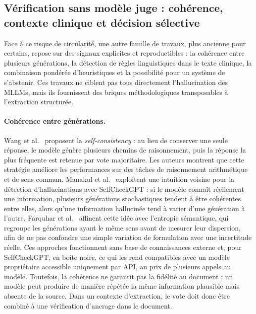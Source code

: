 \subsection{Vérification sans modèle juge : cohérence, contexte clinique et décision sélective}

Face à ce risque de circularité, une autre famille de travaux, plus ancienne pour certains, repose sur des signaux explicites et reproductibles : la cohérence entre plusieurs générations, la détection de règles linguistiques dans le texte clinique, la combinaison pondérée d'heuristiques et la possibilité pour un système de s'abstenir. Ces travaux ne ciblent pas tous directement l'hallucination des MLLMs, mais ils fournissent des briques méthodologiques transposables à l'extraction structurée.

\paragraph{Cohérence entre générations.}
Wang et al.~\cite{wang2023selfconsistency} proposent la \textit{self-consistency} : au lieu de conserver une seule réponse, le modèle génère plusieurs chemins de raisonnement, puis la réponse la plus fréquente est retenue par vote majoritaire. Les auteurs montrent que cette stratégie améliore les performances sur des tâches de raisonnement arithmétique et de sens commun. Manakul et al.~\cite{manakul2023selfcheckgpt} exploitent une intuition voisine pour la détection d'hallucinations avec SelfCheckGPT : si le modèle connaît réellement une information, plusieurs générations stochastiques tendent à être cohérentes entre elles, alors qu'une information hallucinée tend à varier d'une génération à l'autre. Farquhar et al.~\cite{farquhar2024semantic} affinent cette idée avec l'entropie sémantique, qui regroupe les générations ayant le même sens avant de mesurer leur dispersion, afin de ne pas confondre une simple variation de formulation avec une incertitude réelle. Ces approches fonctionnent sans base de connaissances externe et, pour SelfCheckGPT, en boîte noire, ce qui les rend compatibles avec un modèle propriétaire accessible uniquement par API, au prix de plusieurs appels au modèle. Toutefois, la cohérence ne garantit pas la fidélité au document : un modèle peut produire de manière répétée la même information plausible mais absente de la source. Dans un contexte d'extraction, le vote doit donc être combiné à une vérification d'ancrage dans le document.


